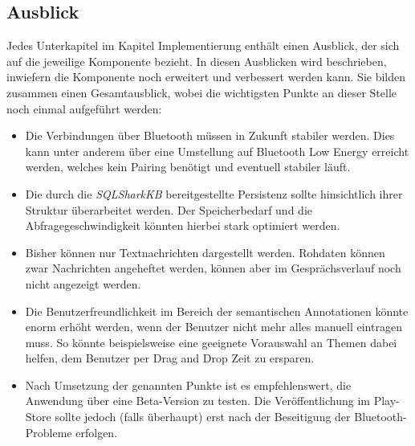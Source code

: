 \subsection{Ausblick}
Jedes Unterkapitel im Kapitel Implementierung enthält einen Ausblick, der sich auf die jeweilige Komponente bezieht. In diesen Ausblicken wird beschrieben, inwiefern die Komponente noch erweitert und verbessert werden kann. Sie bilden zusammen einen Gesamtausblick, wobei die wichtigsten Punkte an dieser Stelle noch einmal aufgeführt werden:
\begin{itemize}
	\item Die Verbindungen über Bluetooth müssen in Zukunft stabiler werden. Dies kann unter anderem über eine Umstellung auf Bluetooth Low Energy erreicht werden, welches kein Pairing benötigt und eventuell stabiler läuft.
	\item Die durch die \textit{SQLSharkKB} bereitgestellte Persistenz sollte hinsichtlich ihrer Struktur überarbeitet werden. Der Speicherbedarf und die Abfragegeschwindigkeit könnten hierbei stark optimiert werden.
	\item Bisher können nur Textnachrichten dargestellt werden. Rohdaten können zwar Nachrichten angeheftet werden, können aber im Gesprächsverlauf noch nicht angezeigt werden.
	\item Die Benutzerfreundlichkeit im Bereich der semantischen Annotationen könnte enorm erhöht werden, wenn der Benutzer nicht mehr alles manuell eintragen muss. So könnte beispielsweise eine geeignete Vorauswahl an Themen dabei helfen, dem Benutzer per Drag and Drop Zeit zu ersparen.
	\item Nach Umsetzung der genannten Punkte ist es empfehlenswert, die Anwendung über eine Beta-Version zu testen. Die Veröffentlichung im Play-Store sollte jedoch (falls überhaupt) erst nach der Beseitigung der Bluetooth-Probleme erfolgen. 
\end{itemize}


 